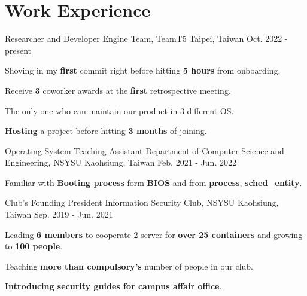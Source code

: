 \section*{Work Experience}

\cventry
{Researcher and Developer} %
{Engine Team, TeamT5} %
{Taipei, Taiwan} %
{Oct. 2022 - present} %
{
  \begin{cvitem}
    \item {Shoving in my \textbf{first} commit right before hitting \textbf{5 hours} from onboarding.}
    \item {Receive \textbf{3} coworker awards at the \textbf{first} retrospective meeting.}
    \item {The only one who can maintain our product in 3 different OS.}
    \item {\textbf{Hosting} a project before hitting \textbf{3 months} of joining.}
  \end{cvitem}
}

\cventry
{Operating System Teaching Assistant} %
{Department of Computer Science and Engineering, NSYSU} %
{Kaohsiung, Taiwan} %
{Feb. 2021 - Jun. 2022} %
{
  \begin{cvitem}
    \item Familiar with \textbf{Booting process} form \textbf{BIOS} and from \textbf{process}, \textbf{sched\_entity}.   
  \end{cvitem}
}

\cventry
{Club's Founding President} %
{Information Security Club, NSYSU} %
{Kaohsiung, Taiwan} %
{Sep. 2019 - Jun. 2021} %
{
  \begin{cvitem} %
    \item {Leading \textbf{6 members} to cooperate 2 server for \textbf{over 25 containers} and growing to \textbf{100 people}.}
    \item {Teaching \textbf{more than compulsory's} number of people in our club.}
    \item {\textbf{Introducing security guides for campus affair office}.}
  \end{cvitem}
}
